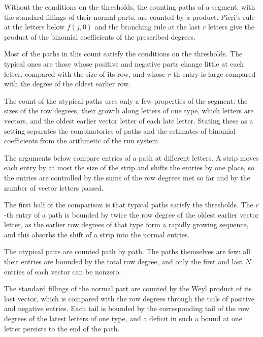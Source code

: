 Without the conditions on the thresholds, the counting paths of a segment, with the standard fillings of their normal
parts, are counted by a product. Pieri's rule at the letters below $f(j,0)$ and the branching rule at the last $r$
letters give the product of the binomial coefficients of the prescribed degrees.

Most of the paths in this count satisfy the conditions on the thresholds. The typical ones are those whose positive and
negative parts change little at each letter, compared with the size of its row, and whose $r$-th entry is large compared
with the degree of the oldest earlier row.

The count of the atypical paths uses only a few properties of the segment: the sizes of the row degrees, their growth
along letters of one type, which letters are vectors, and the oldest earlier vector letter of each late letter. Stating
these as a setting separates the combinatorics of paths and the estimates of binomial coefficients from the arithmetic
of the run system.

The arguments below compare entries of a path at different letters. A strip moves each entry by at most the size of
the strip and shifts the entries by one place, so the entries are controlled by the sums of the row degrees met so far
and by the number of vector letters passed.

The first half of the comparison is that typical paths satisfy the thresholds. The $r$-th entry of a path is bounded by
twice the row degree of the oldest earlier vector letter, as the earlier row degrees of that type form a rapidly growing
sequence, and this absorbs the shift of a strip into the normal entries.

The atypical pairs are counted path by path. The paths themselves are few: all their entries are bounded by the total
row degree, and only the first and last $N$ entries of each vector can be nonzero.

The standard fillings of the normal part are counted by the Weyl product of its last vector, which is compared with the
row degrees through the tails of positive and negative entries. Each tail is bounded by the corresponding tail of the
row degrees of the latest letters of one type, and a deficit in such a bound at one letter persists to the end of the
path.

